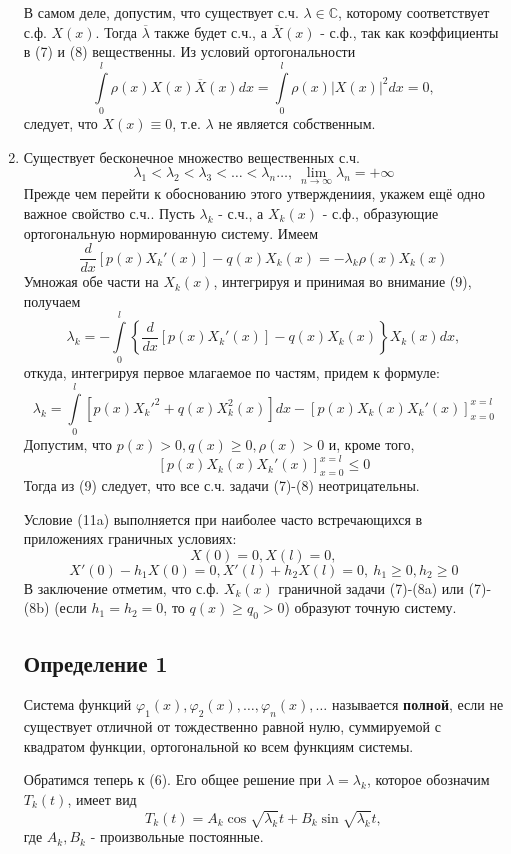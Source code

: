 \begin{enumerate}
{					В самом деле, допустим, что существует с.ч. $\lambda \in \mathbb{C}$, которому соответствует с.ф. $X(x)$. Тогда $\overline{\lambda}$ также будет с.ч., а $\overline{X}(x)$ - с.ф., так как коэффициенты в (7) и (8) вещественны. Из условий ортогональности
					\[
						\int\limits_0^l \rho(x) X(x) \overline{X}(x) dx = \int\limits_0^l \rho(x) \left| X(x)\right|^2 dx=0,
					\]
					следует, что $X(x) \equiv 0$, т.е. $\lambda$ не является собственным.
				}
			\item{Существует бесконечное множество вещественных с.ч.
					\[
						\lambda_1 < \lambda_2 < \lambda_3 < \dots < \lambda_n \dots, ~ \lim_{n \to \infty} \lambda_n = +\infty
					\]	
				Прежде чем перейти к обоснованию этого утверждениия, укажем ещё одно важное свойство с.ч.. Пусть $\lambda_k$ - с.ч., а $X_k(x)$ - с.ф., образующие ортогональную нормированную систему. Имеем
				\[
					\frac{d}{dx} \left[ p(x) X_k'(x)\right] - q(x) X_k (x) = -\lambda_k \rho(x) X_k (x)
				\]
				Умножая обе части на $X_k (x)$, интегрируя и принимая во внимание (9), получаем
				\[
					\lambda_k = -\int\limits_0^l \left\{ \frac{d}{dx} \left[ p(x) X_k'(x)\right]-q(x) X_k(x)\right\} X_k(x) dx,
				\]
				откуда, интегрируя первое млагаемое по частям, придем к формуле:
				\[
					\lambda_k = \int\limits_0^l \left[ p(x) {X_k'}^2+q(x) X_k^2(x)\right]dx - \left[p(x) X_k(x) X_k'(x) \right]_{x=0}^{x=l} \tag{11}
				\]
				Допустим, что $p(x)>0, q(x)\ge 0, \rho(x)>0$ и, кроме того,
				\[
					\left[ p(x) X_k(x) X_k'(x)\right]_{x=0}^{x=l} \le 0 \tag{11a}
				\]
				Тогда из (9) следует, что все с.ч. задачи (7)-(8) неотрицательны.

				Условие (11a) выполняется при наиболее часто встречающихся в приложениях граничных условиях:
				\[
					X(0)=0, X(l)=0 \tag{8a},
				\]
				\[
					X'(0)-h_1X(0)=0, X'(l) + h_2 X(l) = 0, ~ h_1 \ge 0, h_2 \ge 0 \tag{8b}
				\]
				В заключение отметим, что с.ф. $X_k(x)$ граничной задачи (7)-(8a) или (7)-(8b) (если $h_1 = h_2 = 0$, то $q(x) \ge q_0 > 0$) образуют точную систему.
					}
\subsection{Определение 1}
Система функций $\varphi_1(x), \varphi_2(x), \dots, \varphi_n (x), \dots$ называется \textbf{полной}, если не существует отличной от тождественно равной нулю, суммируемой с квадратом функции, ортогональной ко всем функциям системы.

Обратимся теперь к (6). Его общее решение при $\lambda = \lambda_k$, которое обозначим $T_k(t)$, имеет вид
\[
	T_k (t) = A_k \cos \sqrt{\lambda_k} t + B_k \sin \sqrt{\lambda_k} t,
\]
где $A_k, B_k$ - произвольные постоянные.


\end{enumerate}
